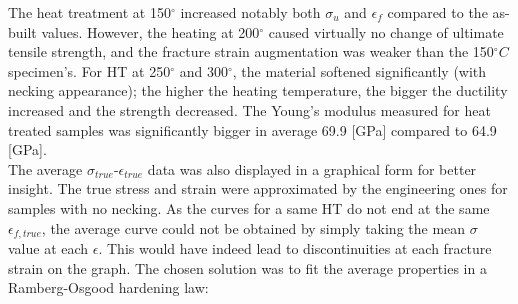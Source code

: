  \begin{center}
\begin{table}[ht]
\noindent{}

\caption[Average tensile mechanical properties of the heat-treated specimens from batch X200-180417]{Average tensile mechanical properties of the heat-treated specimens from batch X200-180417}
\label{tab:tracMHT}
\end{table}
 \end{center}

The heat treatment at 150$^\circ$ increased notably both $\sigma_u$ and $\epsilon_f$ compared to the as-built values. However, the heating at 200$^\circ$ caused virtually no change of ultimate tensile strength, and the fracture strain augmentation was weaker than the 150$^\circ C$ specimen's. For HT at 250$^\circ$ and 300$^\circ$, the material softened significantly (with necking appearance); the higher the heating temperature, the bigger the ductility increased and the strength decreased. The Young's modulus measured for heat treated samples was significantly bigger in average 69.9 [GPa] compared to 64.9 [GPa].\\

The average $\sigma_{true}$-$\epsilon_{true}$ data was also displayed in a graphical form for better insight. The true stress and strain were approximated by the engineering ones for samples with no necking. As the curves for a same HT do not end at the same $\epsilon_{f,true}$, the average curve could not be obtained by simply taking the mean $\sigma$ value at each $\epsilon$. This would have indeed lead to discontinuities at each fracture strain on the graph. The chosen solution was to fit the average properties in a Ramberg-Osgood hardening law:\\

